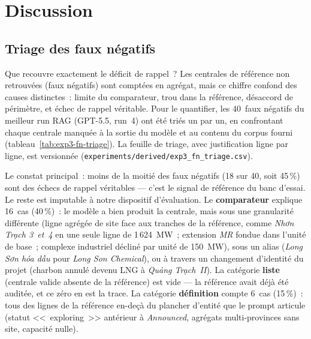 \documentclass[a4paper,11pt]{report}
\begin{document}
\section{Discussion}

\subsection{Triage des faux négatifs}\label{sec:fn-triage}

Que recouvre exactement le déficit de rappel~? Les centrales de référence non retrouvées (faux négatifs) sont comptées en agrégat, mais ce chiffre confond des causes distinctes~: limite du comparateur, trou dans la référence, désaccord de périmètre, et échec de rappel véritable. Pour le quantifier, les 40~faux négatifs du meilleur run RAG (GPT-5.5, run~4) ont été triés un par un, en confrontant chaque centrale manquée à la sortie du modèle et au contenu du corpus fourni (tableau~\ref{tab:exp3-fn-triage}). La feuille de triage, avec justification ligne par ligne, est versionnée (\texttt{experiments/derived/exp3\_fn\_triage.csv}).


Le constat principal~: moins de la moitié des faux négatifs (18 sur 40, soit 45\,\%) sont des échecs de rappel véritables --- c'est le signal de référence du banc d'essai. Le reste est imputable à notre dispositif d'évaluation. Le \textbf{comparateur} explique 16~cas (40\,\%)~: le modèle a bien produit la centrale, mais sous une granularité différente (ligne agrégée de site face aux tranches de la référence, comme \textit{Nhơn Trạch 3~et~4} en une seule ligne de 1\,624~MW~; extension \textit{MR} fondue dans l'unité de base~; complexe industriel décliné par unité de 150~MW), sous un alias (\textit{Long Sơn hóa dầu} pour \textit{Long Son Chemical}), ou à travers un changement d'identité du projet (charbon annulé devenu LNG à \textit{Quảng Trạch~II}). La catégorie \textbf{liste} (centrale valide absente de la référence) est vide --- la référence avait déjà été auditée, et ce zéro en est la trace. La catégorie \textbf{définition} compte 6~cas (15\,\%)~: tous des lignes de la référence en-deçà du plancher d'entité que le prompt articule (statut <<~exploring~>> antérieur à \textit{Announced}, agrégats multi-provinces sans site, capacité nulle).
\end{document}
